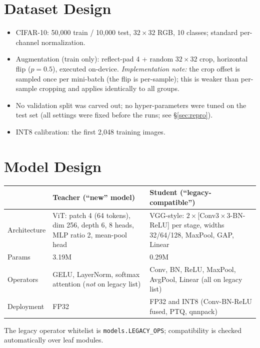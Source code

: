 \documentclass[11pt]{article}
\begin{document}
\section{Dataset Design}
\begin{itemize}
  \item CIFAR-10: 50{,}000 train / 10{,}000 test, $32\times32$ RGB, 10 classes; standard per-channel normalization.
  \item Augmentation (train only): reflect-pad 4 + random $32\times32$ crop, horizontal flip ($p=0.5$),
        executed on-device. \emph{Implementation note:} the crop offset is sampled once per mini-batch
        (the flip is per-sample); this is weaker than per-sample cropping and applies identically to all groups.
  \item No validation split was carved out; no hyper-parameters were tuned on the test set
        (all settings were fixed before the runs; see \S\ref{sec:repro}).
  \item INT8 calibration: the first 2{,}048 training images.
\end{itemize}

\section{Model Design}
\begin{center}\begin{tabular}{p{2.1cm}p{6.3cm}p{5.6cm}}\toprule
 & Teacher (``new'' model) & Student (``legacy-compatible'')\\\midrule
Architecture & ViT: patch 4 (64 tokens), dim 256, depth 6, 8 heads, MLP ratio 2, mean-pool head &
VGG-style: $2\times$[Conv$3\times3$-BN-ReLU] per stage, widths 32/64/128, MaxPool, GAP, Linear\\
Params & 3.19M & 0.29M\\
Operators & GELU, LayerNorm, softmax attention (\emph{not} on legacy list) &
Conv, BN, ReLU, MaxPool, AvgPool, Linear (all on legacy list)\\
Deployment & FP32 & FP32 and INT8 (Conv-BN-ReLU fused, PTQ, qnnpack)\\\bottomrule
\end{tabular}\end{center}
The legacy operator whitelist is \texttt{models.LEGACY\_OPS}; compatibility is checked automatically over leaf modules.
\end{document}
